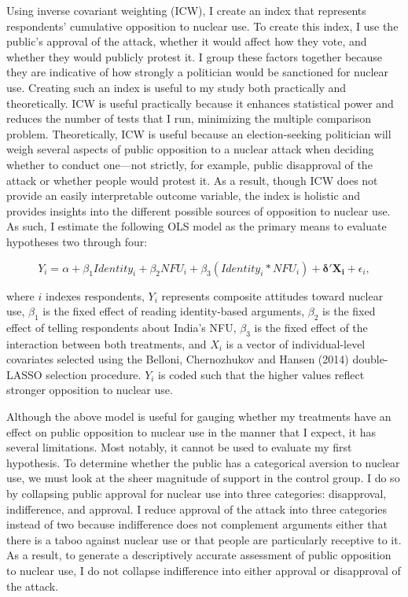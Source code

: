\documentclass[12pt]{article}
\begin{document}
Using inverse covariant weighting (ICW), I create an index that represents respondents' cumulative opposition to nuclear use. To create this index, I use the public's approval of the attack, whether it would affect how they vote, and whether they would publicly protest it. I group these factors together because they are indicative of how strongly a politician would be sanctioned for nuclear use. Creating such an index is useful to my study both practically and theoretically. ICW is useful practically because it enhances statistical power and reduces the number of tests that I run, minimizing the multiple comparison problem. Theoretically, ICW is useful because an election-seeking politician will weigh several aspects of public opposition to a nuclear attack when deciding whether to conduct one—not strictly, for example, public disapproval of the attack or whether people would protest it. As a result, though ICW does not provide an easily interpretable outcome variable, the index is holistic and provides insights into the different possible sources of opposition to nuclear use. As such, I estimate the following OLS model as the primary means to evaluate hypotheses two through four:

\begin{equation}
Y_i=\alpha+\beta_1Identity_i+\beta_2NFU_i+\beta_3(Identity_i*NFU_i)+\mathbf{\delta'X_i} +\epsilon_{i},
\end{equation}

\noindent
where $i$ indexes respondents, $Y_i$ represents composite attitudes toward nuclear use, $\beta_1$ is the fixed effect of reading identity-based arguments, $\beta_2$ is the fixed effect of telling respondents about India's NFU, $\beta_3$ is the fixed effect of the interaction between both treatments, and $X_i$ is a vector of individual-level covariates selected using the Belloni, Chernozhukov and Hansen (2014) double-LASSO selection procedure. $Y_i$ is coded such that the higher values reflect stronger opposition to nuclear use.

Although the above model is useful for gauging whether my treatments have an effect on public opposition to nuclear use in the manner that I expect, it has several limitations. Most notably, it cannot be used to evaluate my first hypothesis. To determine whether the public has a categorical aversion to nuclear use, we must look at the sheer magnitude of support in the control group. I do so by collapsing public approval for nuclear use into three categories: disapproval, indifference, and approval. I reduce approval of the attack into three categories instead of two because indifference does not complement arguments either that there is a taboo against nuclear use or that people are particularly receptive to it. As a result, to generate a descriptively accurate assessment of public opposition to nuclear use, I do not collapse indifference into either approval or disapproval of the attack.
\end{document}

